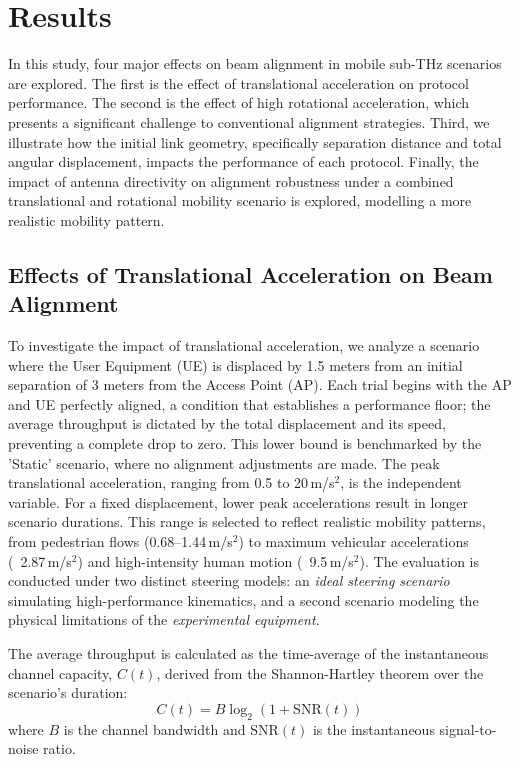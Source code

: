 \documentclass[fleqn,10pt]{wlscirep}
\begin{document}
\section*{Results}

In this study, four major effects on beam alignment in mobile sub-THz scenarios are explored. The first is the effect of translational acceleration on protocol performance. The second is the effect of high rotational acceleration, which presents a significant challenge to conventional alignment strategies. Third, we illustrate how the initial link geometry, specifically separation distance and total angular displacement, impacts the performance of each protocol. Finally, the impact of antenna directivity on alignment robustness under a combined translational and rotational mobility scenario is explored, modelling a more realistic mobility pattern.

\subsection*{Effects of Translational Acceleration on Beam Alignment}

To investigate the impact of translational acceleration, we analyze a scenario where the User Equipment (UE) is displaced by 1.5 meters from an initial separation of 3 meters from the Access Point (AP). Each trial begins with the AP and UE perfectly aligned, a condition that establishes a performance floor; the average throughput is dictated by the total displacement and its speed, preventing a complete drop to zero. This lower bound is benchmarked by the 'Static' scenario, where no alignment adjustments are made. The peak translational acceleration, ranging from 0.5 to 20\,m/s$^2$, is the independent variable. For a fixed displacement, lower peak accelerations result in longer scenario durations. This range is selected to reflect realistic mobility patterns, from pedestrian flows (0.68--1.44\,m/s$^2$) to maximum vehicular accelerations (~2.87\,m/s$^2$) and high-intensity human motion (~9.5\,m/s$^2$). The evaluation is conducted under two distinct steering models: an \textit{ideal steering scenario} simulating high-performance kinematics, and a second scenario modeling the physical limitations of the \textit{experimental equipment}.

The average throughput is calculated as the time-average of the instantaneous channel capacity, $C(t)$, derived from the Shannon-Hartley theorem over the scenario's duration:
\begin{equation}
    C(t) = B \log_2(1 + \text{SNR}(t))
\end{equation}
where $B$ is the channel bandwidth and $\text{SNR}(t)$ is the instantaneous signal-to-noise ratio.
\end{document}
